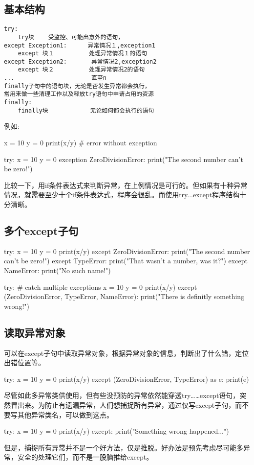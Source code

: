 \subsection{基本结构}
\begin{framed}
\begin{verbatim}
try:
    try块    受监控、可能出意外的语句，
except Exception1:　　　 异常情况１,exception1
    except 块１          处理异常情况１的语句
except Exception2:       异常情况2,exception2
    except 块２          处理异常情况2的语句
...                      直至n
finally子句中的语句块，无论是否发生异常都会执行，
常用来做一些清理工作以及释放try语句中申请占用的资源
finally:
    finally块            无论如何都会执行的语句
\end{verbatim}
\end{framed}
例如:
\begin{python}
x  = 10
y = 0
print(x/y) # error without exception

try:
    x = 10
    y = 0
exception ZeroDivisionError:
    print("The second number can't be zero!")
\end{python}
比较一下，用if条件表达式来判断异常，在上例情况是可行的。但如果有十种异常情况，就需要至少十个if条件表达式，程序会很乱。而使用try...except程序结构十分清晰。
\subsection{多个except子句}
\begin{python}
try:
    x = 10
    y = 0
    print(x/y)
except ZeroDivisionError:
    print("The second number can't be zero!")
except TypeError:
    print("That wasn't a number, was it?")
except NameError:
    print("No such name!")

try:  # catch multiple exceptions
    x = 10
    y = 0
    print(x/y)
except (ZeroDivisionError, TypeError, NameError):
    print("There is definitly something wrong!")
\end{python}
\subsection{读取异常对象}
可以在except子句中读取异常对象，根据异常对象的信息，判断出了什么错，定位出错位置等。
\begin{python}
try:
    x = 10
    y = 0
    print(x/y)
except (ZeroDivisionError, TypeError) as e:
    print(e)
\end{python}
尽管如此多异常类供使用，但有些没预防的异常依然能穿透try……except语句，突然冒出来。为防止有遗漏异常，人们想捕捉所有异常，通过仅写except子句，而不要写其他异常类名，可以做到这点。
\begin{python}
try:
    x = 10
    y = 0
    print(x/y)
except:
    print("Something wrong happened...")
\end{python}
但是，捕捉所有异常并不是一个好方法，仅是推脱。好办法是预先考虑尽可能多异常，安全的处理它们，而不是一股脑推给except。
